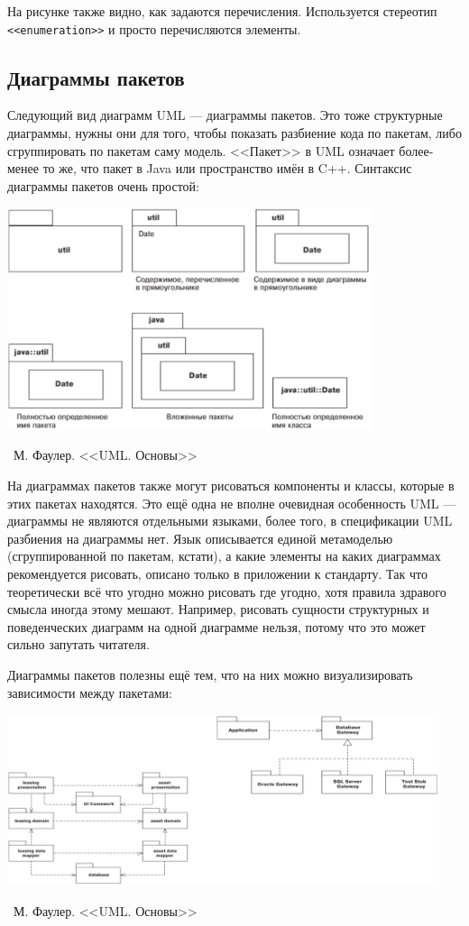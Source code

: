 \documentclass[a5paper]{article}
\newcommand{\attribution}[1] {
    \vspace{-5mm}\begin{flushright}\begin{scriptsize}%
    {\textcopyright\, #1}\end{scriptsize}\end{flushright}
}
\begin{document}
На рисунке также видно, как задаются перечисления. Используется стереотип \verb|<<enumeration>>| и просто перечисляются элементы.

\subsection{Диаграммы пакетов}

Следующий вид диаграмм UML --- диаграммы пакетов. Это тоже структурные диаграммы, нужны они для того, чтобы показать разбиение кода по пакетам, либо сгруппировать по пакетам саму модель. <<Пакет>> в UML означает более-менее то же, что пакет в Java или пространство имён в C++. Синтаксис диаграммы пакетов очень простой:

\begin{center}
    \includegraphics[width=0.8\textwidth]{packageDiagrams.png}
    \attribution{М. Фаулер. <<UML. Основы>>}
\end{center}

На диаграммах пакетов также могут рисоваться компоненты и классы, которые в этих пакетах находятся. Это ещё одна не вполне очевидная особенность UML --- диаграммы не являются отдельными языками, более того, в спецификации UML разбиения на диаграммы нет. Язык описывается единой метамоделью (сгруппированной по пакетам, кстати), а какие элементы на каких диаграммах рекомендуется рисовать, описано только в приложении к стандарту. Так что теоретически всё что угодно можно рисовать где угодно, хотя правила здравого смысла иногда этому мешают. Например, рисовать сущности структурных и поведенческих диаграмм на одной диаграмме нельзя, потому что это может сильно запутать читателя.

Диаграммы пакетов полезны ещё тем, что на них можно визуализировать зависимости между пакетами:

\begin{center}
    \includegraphics[width=0.95\textwidth]{packageDependencies.png}
    \attribution{М. Фаулер. <<UML. Основы>>}
\end{center}
\end{document}
